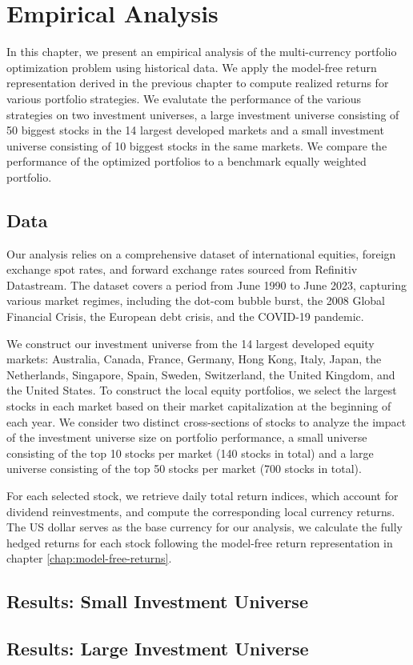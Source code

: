 \chapter{Empirical Analysis}

In this chapter, we present an empirical analysis of the multi-currency portfolio optimization problem using historical data. We apply the model-free return representation derived in the previous chapter to compute realized returns for various portfolio strategies. We evalutate the performance of the various strategies on two investment universes, a large investment universe consisting of 50 biggest stocks in the 14 largest developed markets and a small investment universe consisting of 10 biggest stocks in the same markets. We compare the performance of the optimized portfolios to a benchmark equally weighted portfolio. 

\section{Data}

Our analysis relies on a comprehensive dataset of international equities, foreign exchange spot rates, and forward exchange rates sourced from Refinitiv Datastream. The dataset covers a period from June 1990 to June 2023, capturing various market regimes, including the dot-com bubble burst, the 2008 Global Financial Crisis, the European debt crisis, and the COVID-19 pandemic. 

We construct our investment universe from the 14 largest developed equity markets: Australia, Canada, France, Germany, Hong Kong, Italy, Japan, the Netherlands, Singapore, Spain, Sweden, Switzerland, the United Kingdom, and the United States. To construct the local equity portfolios, we select the largest stocks in each market based on their market capitalization at the beginning of each year. We consider two distinct cross-sections of stocks to analyze the impact of the investment universe size on portfolio performance, a small universe consisting of the top 10 stocks per market (140 stocks in total) and a large universe consisting of the top 50 stocks per market (700 stocks in total). 

For each selected stock, we retrieve daily total return indices, which account for dividend reinvestments, and compute the corresponding local currency returns. The US dollar serves as the base currency for our analysis, we calculate the fully hedged returns for each stock following the model-free return representation in chapter \ref{chap:model-free-returns}.

\section{Results: Small Investment Universe}

\section{Results: Large Investment Universe}

